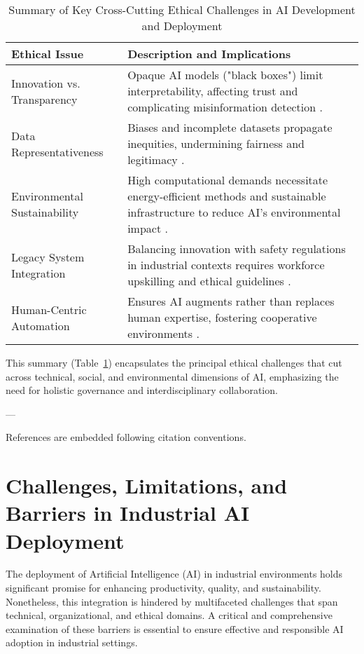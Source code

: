 \documentclass[11pt]{article}
\begin{document}
\begin{table}[ht]
\centering
\caption{Summary of Key Cross-Cutting Ethical Challenges in AI Development and Deployment}
\label{tab:ethical_challenges}
\begin{tabular}{p{4cm} p{10cm}}
\hline
\textbf{Ethical Issue} & \textbf{Description and Implications} \\
\hline
Innovation vs. Transparency & Opaque AI models ("black boxes") limit interpretability, affecting trust and complicating misinformation detection \cite{ref7,ref8}. \\
Data Representativeness & Biases and incomplete datasets propagate inequities, undermining fairness and legitimacy \cite{ref37,ref20}. \\
Environmental Sustainability & High computational demands necessitate energy-efficient methods and sustainable infrastructure to reduce AI's environmental impact \cite{ref19}. \\
Legacy System Integration & Balancing innovation with safety regulations in industrial contexts requires workforce upskilling and ethical guidelines \cite{ref11,ref12,ref38}. \\
Human-Centric Automation & Ensures AI augments rather than replaces human expertise, fostering cooperative environments \cite{ref2}. \\
\hline
\end{tabular}
\end{table}

This summary (Table~\ref{tab:ethical_challenges}) encapsulates the principal ethical challenges that cut across technical, social, and environmental dimensions of AI, emphasizing the need for holistic governance and interdisciplinary collaboration.

---

References are embedded following citation conventions.

\section{Challenges, Limitations, and Barriers in Industrial AI Deployment}

The deployment of Artificial Intelligence (AI) in industrial environments holds significant promise for enhancing productivity, quality, and sustainability. Nonetheless, this integration is hindered by multifaceted challenges that span technical, organizational, and ethical domains. A critical and comprehensive examination of these barriers is essential to ensure effective and responsible AI adoption in industrial settings.
\end{document}
